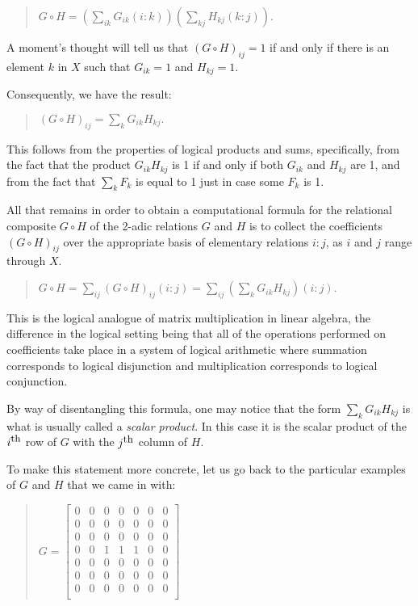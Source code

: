 \documentclass[12pt]{article}
\begin{document}
\begin{quote}
$G \circ H = (\sum_{ik} G_{ik}(i:k))(\sum_{kj} H_{kj}(k:j)).$
\end{quote}

A moment's thought will tell us that $(G \circ H)_{ij} = 1$ if and only if there is an element $k$ in $X$ such that $G_{ik} = 1$ and $H_{kj} = 1$.

Consequently, we have the result:

\begin{quote}
$(G \circ H)_{ij} = \sum_{k} G_{ik} H_{kj}.$
\end{quote}

This follows from the properties of logical products and sums, specifically, from the fact that the product $G_{ik} H_{kj}$ is 1 if and only if both $G_{ik}$ and $H_{kj}$ are 1, and from the fact that $\sum_{k} F_{k}$ is equal to 1 just in case some $F_{k}$ is 1.

All that remains in order to obtain a computational formula for the relational composite $G \circ H$ of the 2-adic relations $G$ and $H$ is to collect the coefficients $(G \circ H)_{ij} $ over the appropriate basis of elementary relations $i:j$, as $i$ and $j$ range through $X$.

\begin{quote}
$G \circ H = \sum_{ij}(G \circ H)_{ij}(i:j) = \sum_{ij}(\sum_{k} G_{ik} H_{kj})(i:j).$
\end{quote}

This is the logical analogue of matrix multiplication in linear algebra, the difference in the logical setting being that all of the operations performed on coefficients take place in a system of logical arithmetic where summation corresponds to logical disjunction and multiplication corresponds to logical conjunction.

By way of disentangling this formula, one may notice that the form $\sum_{k} G_{ik} H_{kj}$ is what is usually called a \textit{scalar product}.  In this case it is the scalar product of the $i^{\mbox{\small{th}}}$ row of $G$ with the $j^{\mbox{\small{th}}}$ column of $H$.

To make this statement more concrete, let us go back to the particular examples of $G$ and $H$ that we came in with:

\begin{quote}$G =
\left[\begin{array}{ccccccc}
0 & 0 & 0 & 0 & 0 & 0 & 0 \\
0 & 0 & 0 & 0 & 0 & 0 & 0 \\
0 & 0 & 0 & 0 & 0 & 0 & 0 \\
0 & 0 & 1 & 1 & 1 & 0 & 0 \\
0 & 0 & 0 & 0 & 0 & 0 & 0 \\
0 & 0 & 0 & 0 & 0 & 0 & 0 \\
0 & 0 & 0 & 0 & 0 & 0 & 0 \\
\end{array}\right]$\end{quote}
\end{document}
